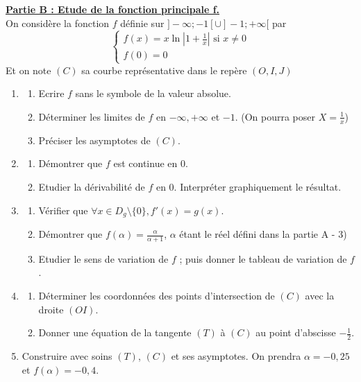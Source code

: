 \documentclass[12pt,a4paper]{article}
\begin{document}
\noindent \underline{\textbf{Partie B : Etude de la fonction principale f.}} \\
On considère la fonction $f$ définie sur $]-\infty; -1[ \cup ]-1; +\infty[$ par 
\[ \begin{cases} f(x) = x \ln \left| 1 + \frac{1}{x} \right| \text{ si } x \neq 0 \\ f(0) = 0 \end{cases} \]
Et on note $(C)$ sa courbe représentative dans le repère $(O, I, J)$
\begin{enumerate}
    \item \begin{enumerate}
        \item Ecrire $f$ sans le symbole de la valeur absolue.
        \item Déterminer les limites de $f$ en $-\infty, +\infty$ et $-1$. (On pourra poser $X = \frac{1}{x}$)
        \item Préciser les asymptotes de $(C)$.
    \end{enumerate}
    \item \begin{enumerate}
        \item Démontrer que $f$ est continue en 0.
        \item Etudier la dérivabilité de $f$ en 0. Interpréter graphiquement le résultat.
    \end{enumerate}
    \item \begin{enumerate}
        \item Vérifier que $\forall x \in D_g \setminus \{0\}, f'(x) = g(x)$.
        \item Démontrer que $f(\alpha) = \frac{\alpha}{\alpha + 1}$, $\alpha$ étant le réel défini dans la partie A - 3)
        \item Etudier le sens de variation de $f$ ; puis donner le tableau de variation de $f$.
    \end{enumerate}
    \item \begin{enumerate}
        \item Déterminer les coordonnées des points d'intersection de $(C)$ avec la droite $(OI)$.
        \item Donner une équation de la tangente $(T)$ à $(C)$ au point d'abscisse $-\frac{1}{2}$.
    \end{enumerate}
    \item Construire avec soins $(T)$, $(C)$ et ses asymptotes. On prendra $\alpha = -0,25$ et $f(\alpha) = -0,4$.
\end{enumerate}
\end{document}
